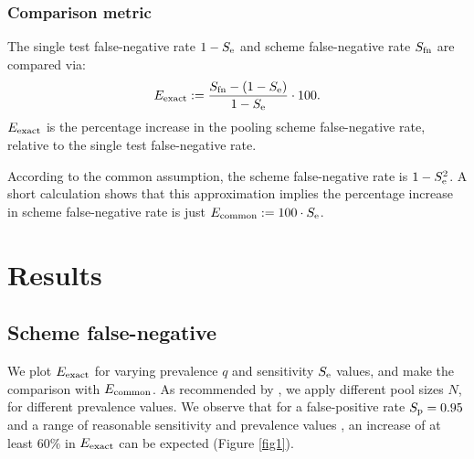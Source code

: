 \documentclass{article}
\begin{document}
\subsubsection*{Comparison metric}
The single test false-negative rate $1-S_\text{e}$ and scheme false-negative
rate $S_{\text{fn}}$ are compared via:
\begin{equation}\label{eq:erel}
E_{\text{{exact}}} := \frac{S_{\text{fn}} - (1-S_\text{e})}{1-S_\text{e}} \cdot 100.
\end{equation}
$E_{\text{{exact}}}$ is the percentage increase in the pooling scheme false-negative
rate, relative to the single test false-negative rate.

According to the common assumption, the scheme false-negative rate is
$1-S_\text{e}^2$. A short calculation shows that this approximation implies
the percentage increase in scheme false-negative rate is just
$E_{\text{{common}}} := 100\cdot S_\text{e}$.

\section*{Results}\label{section:results}
\subsection*{Scheme false-negative}
We plot $E_{\text{{exact}}}$ for varying prevalence $q$ and sensitivity $S_\text{e}$
values, and make the comparison with $E_{\text{{common}}}$. As recommended by
\cite{DorfmanYuvalDor}, we apply different pool sizes $N$, for
different prevalence values. We observe that for a false-positive rate
$S_\text{p}=0.95$ \cite{DorfmanYuvalDor} and a range of reasonable
sensitivity and prevalence values \cite{KitComparison,
  InterpretingCOVID19Test, EstimatingRatesLourenco,
  FalsePositiveEstimate}, an increase of at least $60\%$ in
$E_{\text{{exact}}}$ can be expected (Figure \ref{fig1}).
\end{document}
